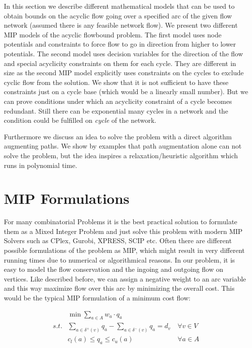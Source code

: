 In this section we describe different mathematical models that can be used to obtain bounds on the acyclic flow going 
over a specified arc of the given flow network (assumed there is any feasible network flow). We present two different 
MIP models of the acyclic flowbound problem. The first model uses node potentials and constraints to force flow to 
go in direction from higher to lower potentials. The second model uses decision variables for the direction of the 
flow and special acyclicity constraints on them for each cycle. They are different in size as the second MIP model 
explicitly uses constraints on the cycles to exclude cyclic flow from the solution. We show that it is not sufficient 
to have these constraints just on a cycle base (which would be a linearly small number). But we can prove 
conditions under which an acyclicity constraint of a cycle becomes redundant. Still there can be exponential many 
cycles in a network and the condition could be fulfilled on \textit{cycle} of the network. 

Furthermore we discuss an idea to solve the problem with a direct algorithm augmenting paths. We show by examples that 
path augmentation alone can not solve the problem, but the idea inspires a relaxation/heuristic algorithm which runs in 
polynomial time.


\section{MIP Formulations}
For many combinatorial Problems it is the best practical solution to formulate them as a Mixed Integer Problem and just 
solve this problem with modern MIP Solvers such as CPlex, Gurobi, XPRESS, SCIP etc. Often there are different possible 
formulations of the problem as MIP, which might result in very different running times due to numerical or algorithmical 
reasons. In our problem, it is easy to model the flow conservation and the ingoing and outgoing flow on vertices. Like 
described before, we can assign a negative weight to an arc variable and this way maximize flow over this arc by 
minimizing the overall cost. This would be the typical MIP formulation of a minimum cost flow:

\begin{align*}
  &\min \sum_{a\in A} w_a\cdot q_a  \\
 s.t. & \sum_{a\in \delta^+(v)}q_a - \sum_{a\in\delta^- (v)}q_a = d_v\ &\forall v\in V \\
  & c_l(a)\le q_a \le c_u(a) & \forall a\in A
\end{align*}

